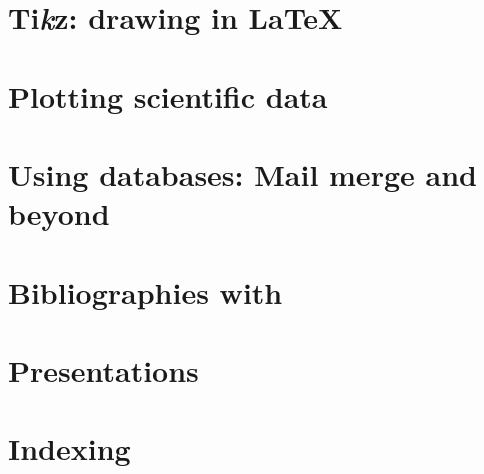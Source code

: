 \section{Ti\protect\emph{k}z: drawing in \LaTeX{}}

\section{Plotting scientific data}

\section{Using databases: Mail merge and beyond}

\section{Bibliographies with \protect{}}

\section{Presentations}

\section{Indexing}



